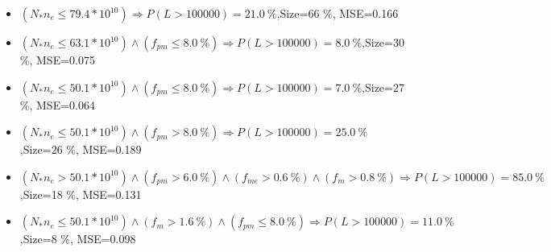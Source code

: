 \documentclass[numbered]{CSL}
\begin{document}
\begin{itemize}
\item $(N_* n_e \leq 79.4 * 10^{10}) \Rightarrow P(L > 100 000) = 21.0~\%$,\hfill Size=66 \%, MSE=0.166
\item $(N_* n_e \leq 63.1 * 10^{10}) \land (f_{pm} \leq 8.0~\%) \Rightarrow P(L > 100 000) = 8.0~\%$,\hfill Size=30 \%, MSE=0.075
\item $(N_* n_e \leq 50.1 * 10^{10}) \land (f_{pm} \leq 8.0~\%) \Rightarrow P(L > 100 000) = 7.0~\%$,\hfill Size=27 \%, MSE=0.064
\item $(N_* n_e \leq 50.1 * 10^{10}) \land (f_{pm} > 8.0~\%) \Rightarrow P(L > 100 000) = 25.0~\%$,\hfill Size=26 \%, MSE=0.189
\item $(N_* n_e > 50.1 * 10^{10}) \land (f_{pm} > 6.0~\%) \land (f_{me} > 0.6~\%) \land (f_m > 0.8~\%) \Rightarrow P(L > 100 000) = 85.0~\%$,\hfill Size=18 \%, MSE=0.131
\item $(N_* n_e \leq 50.1 * 10^{10}) \land (f_m > 1.6~\%) \land (f_{pm} \leq 8.0~\%) \Rightarrow P(L > 100 000) = 11.0~\%$,\hfill Size=8 \%, MSE=0.098
\end{itemize}
\end{document}
